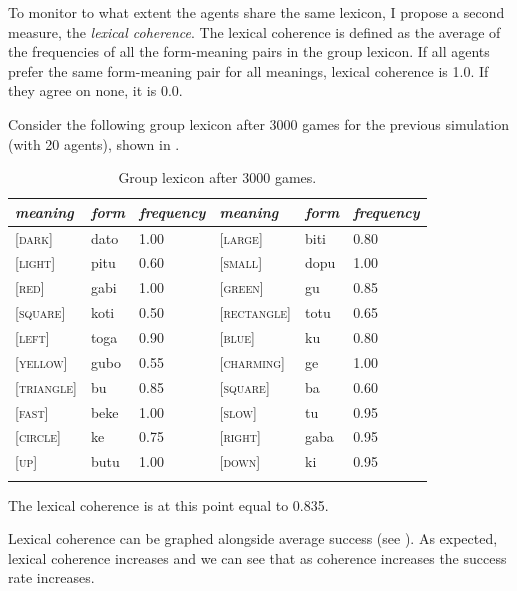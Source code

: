 To monitor to what extent the agents share the same
lexicon, I propose a second measure, the {\itshape lexical
coherence}. The lexical coherence is 
defined as the average of the frequencies of
all the form-meaning pairs in the group lexicon.
If all agents prefer the same form-meaning 
pair for all meanings, lexical coherence is 1.0. If they agree
on none, it is 0.0.

Consider the following group lexicon after 3000 games for the
previous simulation (with 20 agents), shown in . 

\begin{table}
\begin{center}
\begin{tabular}{l  l  l  l  l  l }
\lsptoprule 
{\itshape meaning} & {\itshape form} & {\itshape frequency} & {\itshape meaning} & {\itshape form} & {\itshape frequency} \\ \midrule
{}[\textsc{dark}]& dato & 1.00 & [\textsc{large}]& biti & 0.80 \\  
{}[\textsc{light}]& pitu & 0.60 & [\textsc{small}]& dopu & 1.00 \\  
{}[\textsc{red}]& gabi & 1.00 & [\textsc{green}]& gu & 0.85 \\  
{}[\textsc{square}]& koti & 0.50 & [\textsc{rectangle}]& totu & 0.65 \\  
{}[\textsc{left}]& toga & 0.90 & [\textsc{blue}]& ku & 0.80 \\  
{}[\textsc{yellow}]& gubo & 0.55 & [\textsc{charming}]& ge & 1.00 \\  
{}[\textsc{triangle}]& bu & 0.85 & [\textsc{square}]& ba & 0.60 \\  
{}[\textsc{fast}]& beke & 1.00 & [\textsc{slow}]& tu & 0.95 \\  
{}[\textsc{circle}]& ke & 0.75 & [\textsc{right}]& gaba & 0.95 \\  
{}[\textsc{up}]& butu & 1.00 & [\textsc{down}]& ki & 0.95 \\  
\lspbottomrule
\end{tabular}
\caption{\label{tab:t-mem3000}Group lexicon after 3000 games.}
\end{center}
\end{table}
The lexical coherence is at this point equal to 0.835. 

Lexical coherence can be graphed alongside
average success (see ). As expected, 
lexical coherence increases 
and we can see that as coherence increases the success
rate increases.

